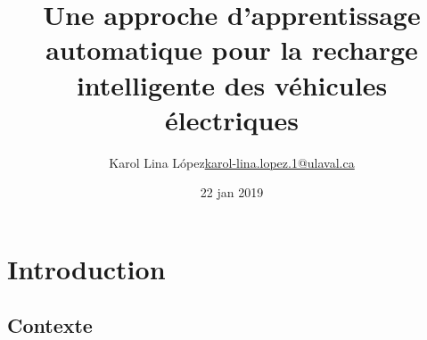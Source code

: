 \documentclass[french]{beamer}
\title[Recharge intelligente de VE]{Une approche d'apprentissage automatique pour la recharge intelligente des véhicules électriques}
\author[Karol Lina L\'opez]{\texorpdfstring{Karol Lina L\'opez\newline\href{mailto:karol-lina.lopez.1@ulaval.ca}{karol-lina.lopez.1@ulaval.ca}}{Karol Lina L\'opez}}
\date{22 jan 2019} %
\begin{document}
{
\newcommand{\abs}[1]{\left\vert#1\right\vert}
\newcommand{\argmin}{\operatornamewithlimits{argmin}}
\newcommand{\argmax}{\operatornamewithlimits{argmax}}
\newcommand{\mean}{\operatornamewithlimits{mean}}

\begin{frame}
\titlepage %
\end{frame}
% 

% 
% 
% 


\section{Introduction}
\subsection{Contexte}

}
\end{document}
